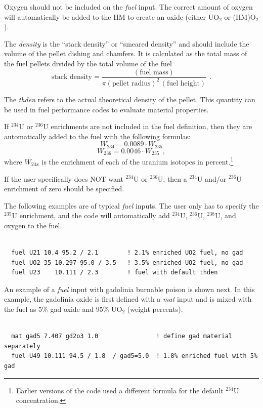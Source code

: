 Oxygen should not be included on the {\it fuel} input. The correct amount of oxygen will automatically
be added to the HM to create an oxide (either UO$_2$ or (HM)O$_2$).

The {\it density} is the ``stack density'' or ``smeared density'' and should include the volume
of the pellet dishing and chamfers.
It is calculated as the total mass of the fuel pellets divided by the total volume of the fuel
\begin{equation}
  \mbox{stack density} = \frac{ (\mbox{fuel mass})} { \pi (\mbox{pellet radius})^2 \, (\mbox{fuel height}) }~~.
\end{equation}

The {\it thden} refers to the actual theoretical density of the pellet. This quantity can be
used in fuel performance codes to evaluate material properties.

If $^{234}$U or $^{236}$U enrichments are not included in the fuel definition, then they are automatically
added to the fuel with the following formulas:
\begin{equation}
   W_{234} = 0.0089 \cdot W_{235}
\end{equation}
\begin{equation}
  W_{236} = 0.0046 \cdot W_{235}~~,
\end{equation}
where $W_{23x}$ is the enrichment of each of the uranium isotopes
in percent.\footnote{Earlier versions of the code used a different formula for the default $^{234}$U concentration.}

If the user specifically does NOT want $^{234}$U or $^{236}$U, then a $^{234}$U
and/or $^{236}$U enrichment of zero should be specified.

The following examples are of typical {\it fuel} inputs. The user
only has to specify the $^{235}$U enrichment, and the code will automatically add
$^{234}$U, $^{236}$U, $^{238}$U, and oxygen to the fuel.
\begin{Verbatim}[fontsize=\small]

  fuel U21 10.4 95.2 / 2.1        ! 2.1% enriched UO2 fuel, no gad
  fuel UO2-35 10.297 95.0 / 3.5   ! 3.5% enriched UO2 fuel, no gad
  fuel U23    10.111 / 2.3        ! fuel with default thden

\end{Verbatim}

An example of a {\it fuel} input with gadolinia burnable poison is shown next.
In this example, the gadolinia oxide is first defined with a {\it mat} input and
is mixed with the fuel as 5\% gad oxide and 95\% UO$_2$ (weight percents).
\begin{Verbatim}[fontsize=\small]

  mat gad5 7.407 gd2o3 1.0                ! define gad material separately
  fuel U49 10.111 94.5 / 1.8  / gad5=5.0  ! 1.8% enriched fuel with 5% gad

\end{Verbatim}

